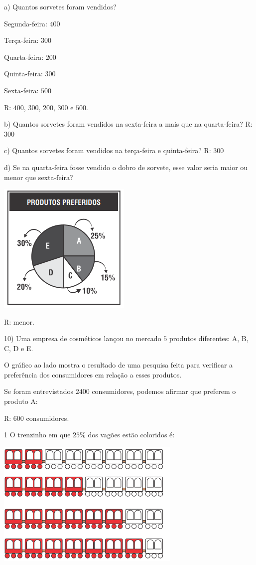 a) Quantos sorvetes foram vendidos?

Segunda-feira: $400$

Terça-feira: $300$

Quarta-feira: $200$

Quinta-feira: $300$

Sexta-feira: $500$

R: $400$, $300$, $200$, $300$ e $500$.

b) Quantos sorvetes foram vendidos na sexta-feira a mais que na
quarta-feira? R: $300$

c) Quantos sorvetes foram vendidos na terça-feira e quinta-feira? R: $300$

d) Se na quarta-feira fosse vendido o dobro de sorvete, esse valor seria
maior ou menor que sexta-feira?

\includegraphics[width=2.51181in,height=2.47708in]{./imgSAEB_6_MAT/media/image88.png}

R: menor.

10) Uma empresa de cosméticos lançou no mercado $5$ produtos diferentes:
A, B, C, D e E.

O gráfico ao lado mostra o resultado de uma pesquisa feita para
verificar a preferência dos consumidores em relação a esses produtos.

Se foram entrevistados $2400$ consumidores, podemos afirmar que preferem o
produto A:

R: $600$ consumidores.


\num{1}  O trenzinho em que $25\%$ dos vagões estão coloridos é:

\includegraphics[width=3.46528in,height=2.38403in]{./imgSAEB_6_MAT/media/image89.png}


